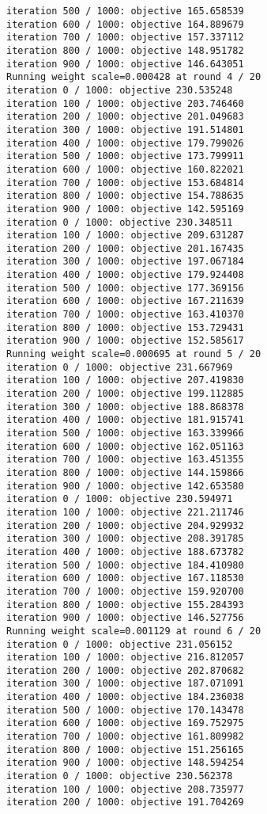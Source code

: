 \documentclass[11pt]{article}
\begin{document}
\begin{Verbatim}[commandchars=\\\{\}]
iteration 500 / 1000: objective 165.658539
iteration 600 / 1000: objective 164.889679
iteration 700 / 1000: objective 157.337112
iteration 800 / 1000: objective 148.951782
iteration 900 / 1000: objective 146.643051
Running weight scale=0.000428 at round 4 / 20
iteration 0 / 1000: objective 230.535248
iteration 100 / 1000: objective 203.746460
iteration 200 / 1000: objective 201.049683
iteration 300 / 1000: objective 191.514801
iteration 400 / 1000: objective 179.799026
iteration 500 / 1000: objective 173.799911
iteration 600 / 1000: objective 160.822021
iteration 700 / 1000: objective 153.684814
iteration 800 / 1000: objective 154.788635
iteration 900 / 1000: objective 142.595169
iteration 0 / 1000: objective 230.348511
iteration 100 / 1000: objective 209.631287
iteration 200 / 1000: objective 201.167435
iteration 300 / 1000: objective 197.067184
iteration 400 / 1000: objective 179.924408
iteration 500 / 1000: objective 177.369156
iteration 600 / 1000: objective 167.211639
iteration 700 / 1000: objective 163.410370
iteration 800 / 1000: objective 153.729431
iteration 900 / 1000: objective 152.585617
Running weight scale=0.000695 at round 5 / 20
iteration 0 / 1000: objective 231.667969
iteration 100 / 1000: objective 207.419830
iteration 200 / 1000: objective 199.112885
iteration 300 / 1000: objective 188.868378
iteration 400 / 1000: objective 181.915741
iteration 500 / 1000: objective 163.339966
iteration 600 / 1000: objective 162.051163
iteration 700 / 1000: objective 163.451355
iteration 800 / 1000: objective 144.159866
iteration 900 / 1000: objective 142.653580
iteration 0 / 1000: objective 230.594971
iteration 100 / 1000: objective 221.211746
iteration 200 / 1000: objective 204.929932
iteration 300 / 1000: objective 208.391785
iteration 400 / 1000: objective 188.673782
iteration 500 / 1000: objective 184.410980
iteration 600 / 1000: objective 167.118530
iteration 700 / 1000: objective 159.920700
iteration 800 / 1000: objective 155.284393
iteration 900 / 1000: objective 146.527756
Running weight scale=0.001129 at round 6 / 20
iteration 0 / 1000: objective 231.056152
iteration 100 / 1000: objective 216.812057
iteration 200 / 1000: objective 202.870682
iteration 300 / 1000: objective 187.071091
iteration 400 / 1000: objective 184.236038
iteration 500 / 1000: objective 170.143478
iteration 600 / 1000: objective 169.752975
iteration 700 / 1000: objective 161.809982
iteration 800 / 1000: objective 151.256165
iteration 900 / 1000: objective 148.594254
iteration 0 / 1000: objective 230.562378
iteration 100 / 1000: objective 208.735977
iteration 200 / 1000: objective 191.704269

\end{Verbatim}
\end{document}
